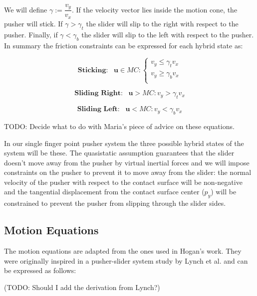 \documentclass[12,twoside]{TFG-GM}
\theoremstyle{definition}
\theoremstyle{remark}
\begin{document}
We will define $\gamma := \dfrac{v_y}{v_x}$. If the velocity vector lies inside the motion cone, the pusher will stick. If $\gamma > \gamma_t$ the slider will slip to the right with respect to the pusher. Finally, if $\gamma < \gamma_b$ the slider will slip to the left with respect to the pusher. In summary the friction constraints can be expressed for each hybrid state as:

\begin{equation} \label{eq:sticking_cone}
\textbf{Sticking:}\,\,\,\,\, \textbf{u} \in MC: 
			\begin{cases}
               v_y \leq \gamma_t v_x\\
               v_y \geq \gamma_b v_x\\
            \end{cases}
\end{equation}

\begin{equation}\label{eq:right_cone}
\textbf{Sliding Right:}\,\,\,\,\, \textbf{u} > MC: v_y > \gamma_t v_x            
\end{equation}

\begin{equation}\label{eq:left_cone}
\textbf{Sliding Left:}\,\,\,\,\, \textbf{u} < MC: v_y < \gamma_b v_x
\end{equation}

TODO: Decide what to do with Maria's piece of advice on these equations.

In our single finger point pusher system the three possible hybrid states of the system will be these. The quasistatic assumption guarantees that the slider doesn't move away from the pusher by virtual inertial forces and we will impose constraints on the pusher to prevent it to move away from the slider: the normal velocity of the pusher with respect to the contact surface will be non-negative and the tangential displacement from the contact surface center ($p_y$) will be constrained to prevent the pusher from slipping through the slider sides.

\subsection{Motion Equations} \label{subsec:motion_equations}
The motion equations are adapted from the ones used in Hogan's work. They were originally inspired in a pusher-slider system study by Lynch et al. \cite{motion_equations} and can be expressed as follows:

(TODO: Should I add the derivation from Lynch?)
\end{document}
